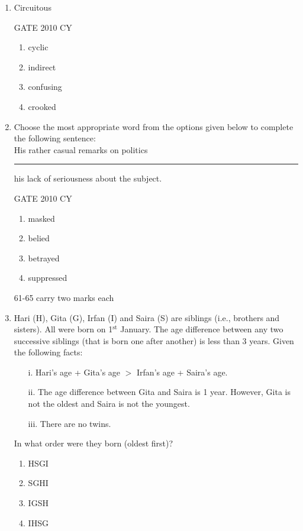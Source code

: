 \documentclass[journal,12pt,onecolumn]{IEEEtran}
\theoremstyle{remark}
\begin{document}
\begin{enumerate}
\item Circuitous

\hfill{GATE 2010 CY}
\begin{multicols}{2}
\begin{enumerate}
    \item cyclic
    \item indirect
    \item confusing
    \item crooked
\end{enumerate}
\end{multicols}
\item Choose the most appropriate word from the options given below to complete the following sentence:\\
His rather casual remarks on politics \rule{2cm}{0.15mm} his lack of seriousness about the subject.

\hfill{GATE 2010 CY}

\begin{multicols}{2}
\begin{enumerate}
    \item masked
    \item belied
    \item betrayed
    \item suppressed
\end{enumerate}
\end{multicols}
61-65 carry two marks each
\item Hari (H), Gita (G), Irfan (I) and Saira (S) are siblings (i.e., brothers and sisters). All were born on 1$^{\text{st}}$ January. The age difference between any two successive siblings (that is born one after another) is less than 3 years. Given the following facts:

\begin{itemize}
    \item[i.] Hari's age + Gita's age $>$ Irfan's age + Saira's age.
    \item[ii.] The age difference between Gita and Saira is 1 year. However, Gita is not the oldest and Saira is not the youngest.
    \item[iii.] There are no twins.
\end{itemize}

In what order were they born (oldest first)?

\begin{multicols}{2}
\begin{enumerate}
    \item HSGI
    \item SGHI
    \item IGSH
    \item IHSG
\end{enumerate}
\end{multicols}


\end{enumerate}
\end{document}
